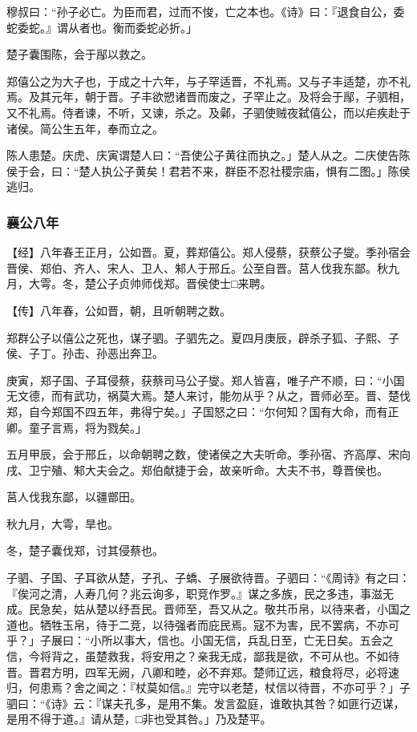 \documentclass[]{article}
\begin{document}
穆叔曰：``孙子必亡。为臣而君，过而不悛，亡之本也。《诗》曰：『退食自公，委蛇委蛇。』谓从者也。衡而委蛇必折。」

楚子囊围陈，会于鄬以救之。

郑僖公之为大子也，于成之十六年，与子罕适晋，不礼焉。又与子丰适楚，亦不礼焉。及其元年，朝于晋。子丰欲愬诸晋而废之，子罕止之。及将会于鄬，子驷相，又不礼焉。侍者谏，不听，又谏，杀之。及鄵，子驷使贼夜弑僖公，而以疟疾赴于诸侯。简公生五年，奉而立之。

陈人患楚。庆虎、庆寅谓楚人曰：``吾使公子黄往而执之。」楚人从之。二庆使告陈侯于会，曰：``楚人执公子黄矣！君若不来，群臣不忍社稷宗庙，惧有二图。」陈侯逃归。

\hypertarget{header-n1901}{%
\subsubsection{襄公八年}\label{header-n1901}}

【经】八年春王正月，公如晋。夏，葬郑僖公。郑人侵蔡，获蔡公子燮。季孙宿会晋侯、郑伯、齐人、宋人、卫人、邾人于邢丘。公至自晋。莒人伐我东鄙。秋九月，大雩。冬，楚公子贞帅师伐郑。晋侯使士□来聘。

【传】八年春，公如晋，朝，且听朝聘之数。

郑群公子以僖公之死也，谋子驷。子驷先之。夏四月庚辰，辟杀子狐、子熙、子侯、子丁。孙击、孙恶出奔卫。

庚寅，郑子国、子耳侵蔡，获蔡司马公子燮。郑人皆喜，唯子产不顺，曰：``小国无文德，而有武功，祸莫大焉。楚人来讨，能勿从乎？从之，晋师必至。晋、楚伐郑，自今郑国不四五年，弗得宁矣。」子国怒之曰：``尔何知？国有大命，而有正卿。童子言焉，将为戮矣。」

五月甲辰，会于邢丘，以命朝聘之数，使诸侯之大夫听命。季孙宿、齐高厚、宋向戌、卫宁殖、邾大夫会之。郑伯献捷于会，故亲听命。大夫不书，尊晋侯也。

莒人伐我东鄙，以疆鄫田。

秋九月，大雩，旱也。

冬，楚子囊伐郑，讨其侵蔡也。

子驷、子国、子耳欲从楚，子孔、子蟜、子展欲待晋。子驷曰：``《周诗》有之曰：『俟河之清，人寿几何？兆云询多，职竞作罗。』谋之多族，民之多违，事滋无成。民急矣，姑从楚以纾吾民。晋师至，吾又从之。敬共币帛，以待来者，小国之道也。牺牲玉帛，待于二竞，以待强者而庇民焉。寇不为害，民不罢病，不亦可乎？」子展曰：``小所以事大，信也。小国无信，兵乱日至，亡无日矣。五会之信，今将背之，虽楚救我，将安用之？亲我无成，鄙我是欲，不可从也。不如待晋。晋君方明，四军无阙，八卿和睦，必不弃郑。楚师辽远，粮食将尽，必将速归，何患焉？舍之闻之：『杖莫如信。』完守以老楚，杖信以待晋，不亦可乎？」子驷曰：``《诗》云：『谋夫孔多，是用不集。发言盈庭，谁敢执其咎？如匪行迈谋，是用不得于道。』请从楚，□非也受其咎。」乃及楚平。
\end{document}
